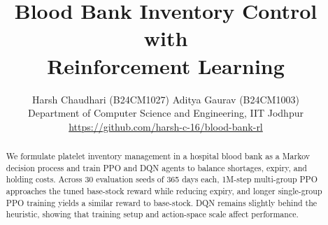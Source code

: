 \documentclass[10pt,twocolumn]{article}
\title{Blood Bank Inventory Control with\\Reinforcement Learning}
\author{
  Harsh Chaudhari (B24CM1027) \quad Aditya Gaurav (B24CM1003)\\
  \small Department of Computer Science and Engineering, IIT Jodhpur\\
  \small \url{https://github.com/harsh-c-16/blood-bank-rl}
}
\date{}
\begin{document}
\maketitle

\begin{abstract}
We formulate platelet inventory management in a hospital blood bank as a Markov decision process and train PPO and DQN agents to balance shortages, expiry, and holding costs. Across 30 evaluation seeds of 365 days each, 1M-step multi-group PPO approaches the tuned base-stock reward while reducing expiry, and longer single-group PPO training yields a similar reward to base-stock. DQN remains slightly behind the heuristic, showing that training setup and action-space scale affect performance.
\end{abstract}







\end{document}
